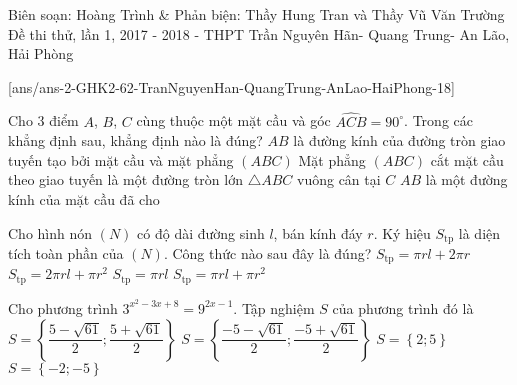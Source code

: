 \begin{name}
{Biên soạn: Hoàng Trình \& Phản biện: Thầy Hung Tran và Thầy Vũ Văn Trường}
{Đề thi thử, lần 1, 2017 - 2018 - THPT Trần Nguyên Hãn- Quang Trung- An Lão, Hải Phòng}
\end{name}
\setcounter{ex}{0}\setcounter{bt}{0}
[ans/ans-2-GHK2-62-TranNguyenHan-QuangTrung-AnLao-HaiPhong-18]

\begin{ex}%
	Cho 3 điểm $A$, $B$, $C$ cùng thuộc một mặt cầu và góc $\widehat {ACB}=90^\circ$. Trong các khẳng định sau, khẳng định nào là đúng?
	\choice
	{\True $AB$ là đường kính của đường tròn giao tuyến tạo bởi mặt cầu và mặt phẳng $(ABC)$}
	{Mặt phẳng $(ABC)$ cắt mặt cầu theo giao tuyến là một đường tròn lớn}
	{$\triangle ABC$ vuông cân tại $C$}
	{$AB$ là một đường kính của mặt cầu đã cho}
	\end{ex}
\begin{ex}%
	Cho hình nón $(N)$ có độ dài đường sinh $l$, bán kính đáy $r$. Ký hiệu $S_\text{tp}$ là diện tích toàn phần của $(N)$. Công thức nào sau đây là đúng?
	\choice
	{$S_\text{tp}=\pi rl+2\pi r$}
	{$S_\text{tp}=2\pi rl+\pi r^2$}
	{$S_\text{tp}=\pi rl$}
	{\True $S_\text{tp}=\pi rl+\pi r^2$}
	\end{ex}
\begin{ex}%
	Cho phương trình $3^{x^2-3x+8}=9^{2x-1}$. Tập nghiệm $S$ của phương trình đó là
	\choice
	{$S=\left\lbrace \dfrac{5-\sqrt{61}}{2};\dfrac{5+\sqrt{61}}{2}\right\rbrace $}
	{$S=\left\lbrace \dfrac{-5-\sqrt{61}}{2};\dfrac{-5+\sqrt{61}}{2}\right\rbrace $}
	{\True $S= \left\lbrace 2;5\right\rbrace $}
	{$S=\left\lbrace -2;-5\right\rbrace $}
	\end{ex}
